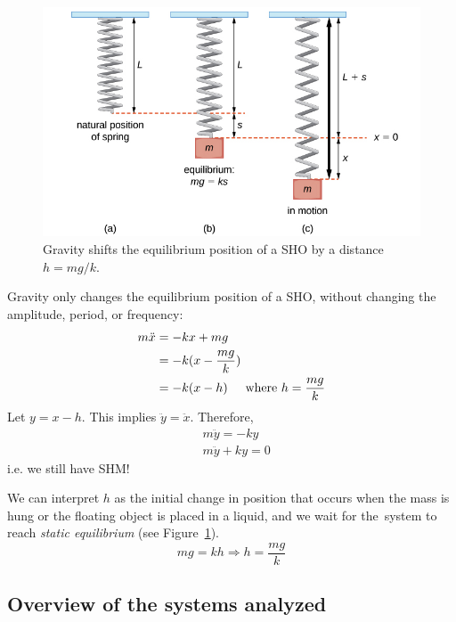 \begin{figure}
	\centering
	\includegraphics[scale=0.4]{phys232/Ch3-g-new-eqm} \caption{Gravity shifts the equilibrium position of a SHO by a distance $h=mg/k$.}\label{ch3:fig-g-new-eqm-pos}
\end{figure}

Gravity only changes the equilibrium position of a SHO, without changing the amplitude, period, or frequency:
\begin{align*}
	m\ddot{x} &= -kx + mg \\
	& = -k(x - \frac{mg}{k}) \\
	& = -k(x - h) \hspace{0.5cm}\text{where } h=\frac{mg}{k}
\end{align*}
Let $y=x-h$. This implies $\ddot{y} = \ddot{x}$. Therefore,
\begin{align*}
	&m\ddot{y} = -ky \\
	&m\ddot{y} + ky = 0 
\end{align*}
i.e. we still have SHM!

We can interpret $h$ as the initial change in position that occurs when the mass is hung or the floating object is placed in a liquid, and we wait for the system to reach \emph{static equilibrium} (see Figure~\ref{ch3:fig-g-new-eqm-pos}).
\[ mg = kh \Longrightarrow \boxed{h = \frac{mg}{k}} \]


\subsection{Overview of the systems analyzed}

